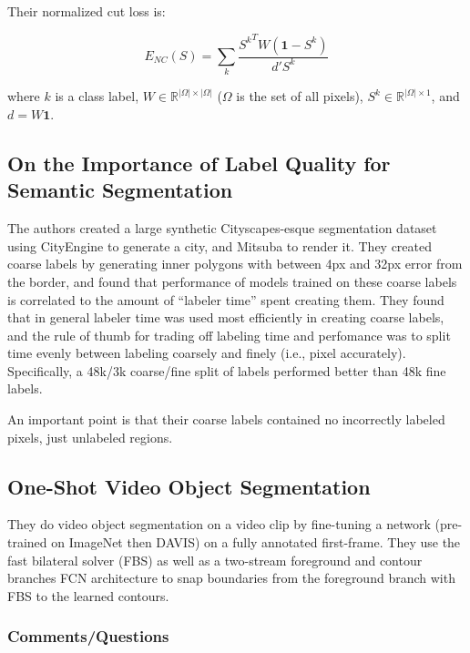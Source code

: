 \documentclass[a4paper, 12pt]{article}
\begin{document}
Their normalized cut loss is:

\begin{equation}
        E_{NC}(S) = \sum_k \frac{{S^k}^T W (\mathbf{1} - S^k)}{d' S^k}
\end{equation}

where $k$ is a class label, $W \in \mathbb{R}^{|\Omega| \times |\Omega|}$
($\Omega$ is the set of all pixels), $S^k \in \mathbb{R}^{|\Omega| \times 1}$,
and~$d = W\mathbf{1}$.


\subsection{On the Importance of Label Quality for Semantic
            Segmentation~\cite{Zlateski_2018_CVPR}}

The authors created a large synthetic Cityscapes-esque segmentation dataset
using CityEngine to generate a city, and Mitsuba to render it. They created
coarse labels by generating inner polygons with between 4px and 32px error from
the border, and found that performance of models trained on these coarse labels
is correlated to the amount of ``labeler time'' spent creating them. They found
that in general labeler time was used most efficiently in creating coarse
labels, and the rule of thumb for trading off labeling time and perfomance was
to split time evenly between labeling coarsely and finely (i.e., pixel
accurately). Specifically, a 48k/3k coarse/fine split of labels performed
better than 48k fine labels.

An important point is that their coarse labels contained no incorrectly labeled
pixels, just unlabeled regions.


\subsection{One-Shot Video Object Segmentation~\cite{caelles2017oneshot}}

They do video object segmentation on a video clip by fine-tuning a network
(pre-trained on ImageNet then DAVIS) on a fully annotated first-frame.
They use the fast bilateral solver (FBS) as well as a two-stream foreground and
contour branches FCN architecture to snap boundaries from the foreground branch
with FBS to the learned contours.

\subsubsection{Comments/Questions}
\end{document}
